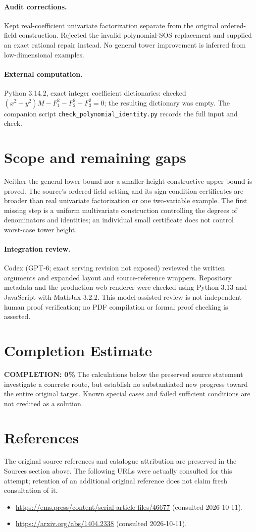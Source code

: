 \documentclass[11pt]{article}
\begin{document}
\paragraph{Audit corrections.} Kept real-coefficient univariate factorization separate from the original ordered-field construction. Rejected the invalid polynomial-SOS replacement and supplied an exact rational repair instead. No general tower improvement is inferred from low-dimensional examples.
\paragraph{External computation.} Python 3.14.2, exact integer coefficient dictionaries: checked $(x^2+y^2)M-F_1^2-F_2^2-F_3^2=0$; the resulting dictionary was empty. The companion script \texttt{check\_polynomial\_identity.py} records the full input and check.
\section{Scope and remaining gaps}
Neither the general lower bound nor a smaller-height constructive upper bound is proved. The source's ordered-field setting and its sign-condition certificates are broader than real univariate factorization or one two-variable example. The first missing step is a uniform multivariate construction controlling the degrees of denominators and identities; an individual small certificate does not control worst-case tower height.
\paragraph{Integration review.} Codex (GPT-6; exact serving revision not exposed) reviewed the written arguments and expanded layout and source-reference wrappers. Repository metadata and the production web renderer were checked using Python 3.13 and JavaScript with MathJax 3.2.2. This model-assisted review is not independent human proof verification; no PDF compilation or formal proof checking is asserted.

\section{Completion Estimate}
\noindent\textbf{COMPLETION: 0\%}
The calculations below the preserved source statement investigate a concrete route,
but establish no substantiated new progress toward the entire original target.
Known special cases and failed sufficient conditions are not credited as a solution.
\section{References}
The original source references and catalogue attribution are preserved in the
Sources section above. The following URLs were actually consulted for this attempt;
retention of an additional original reference does not claim fresh consultation of it.
\begin{itemize}
\item \url{https://ems.press/content/serial-article-files/46677} (consulted 2026-10-11). 
\item \url{https://arxiv.org/abs/1404.2338} (consulted 2026-10-11). 
\end{itemize}
\end{document}
